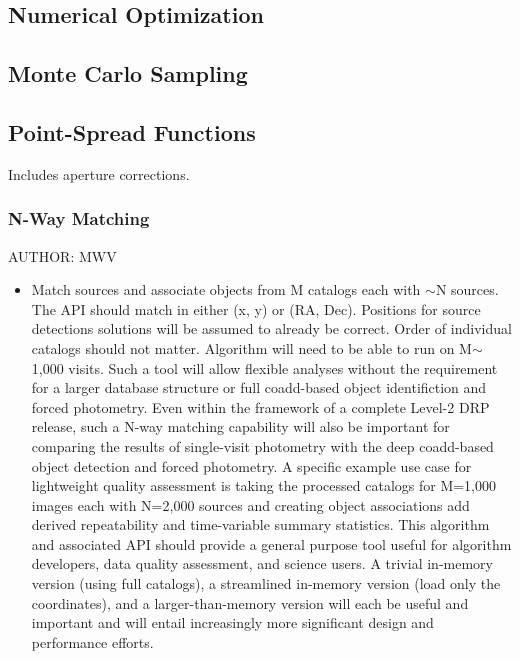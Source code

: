 \subsection{Numerical Optimization}
\label{sec:spOptimization}

\subsection{Monte Carlo Sampling}
\label{sec:spMonte Carlo}

\subsection{Point-Spread Functions}
\label{sec:spPSF}

Includes aperture corrections.

\subsubsection{N-Way Matching}
\label{sec:spNWayMatching}
AUTHOR: MWV
\begin{itemize}
\item Match sources and associate objects from M catalogs each with $\sim$N sources.  The API should match in either (x, y) or (RA, Dec).  Positions for source detections solutions will be assumed to already be correct.  Order of individual catalogs should not matter.  Algorithm will need to be able to run on M$\sim$1,000 visits.  Such a tool will allow flexible analyses without the requirement for a larger database structure or full coadd-based object identifiction and forced photometry.  Even within the framework of a complete Level-2 DRP release, such a N-way matching capability will also be important for comparing the results of single-visit photometry with the deep coadd-based object detection and forced photometry.  A specific example use case for lightweight quality assessment is taking the processed catalogs for M=1,000 images each with N=2,000 sources and creating object associations add derived repeatability and time-variable summary statistics.  This algorithm and associated API should provide a general purpose tool useful for algorithm developers, data quality assessment, and science users.  A trivial in-memory version (using full catalogs), a streamlined in-memory version (load only the coordinates), and a larger-than-memory version will each be useful and important and will entail increasingly more significant design and performance efforts.
\end{itemize}
